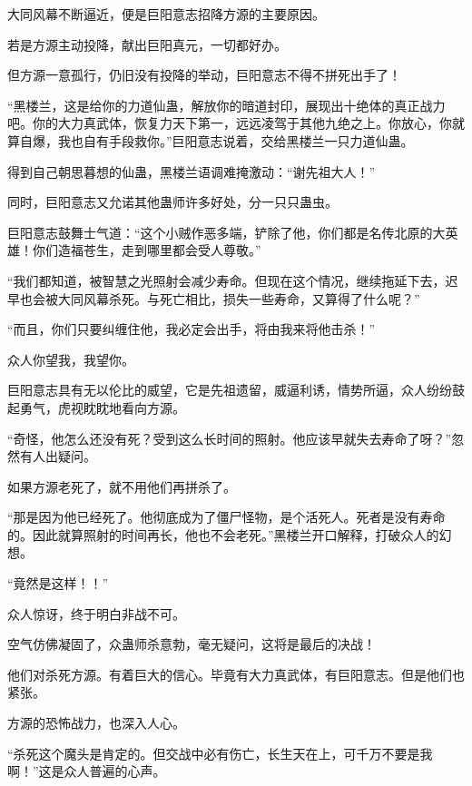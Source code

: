
\begin{this_body}



大同风幕不断逼近，便是巨阳意志招降方源的主要原因。

若是方源主动投降，献出巨阳真元，一切都好办。

但方源一意孤行，仍旧没有投降的举动，巨阳意志不得不拼死出手了！

“黑楼兰，这是给你的力道仙蛊，解放你的暗道封印，展现出十绝体的真正战力吧。你的大力真武体，恢复力天下第一，远远凌驾于其他九绝之上。你放心，你就算自爆，我也自有手段救你。”巨阳意志说着，交给黑楼兰一只力道仙蛊。

得到自己朝思暮想的仙蛊，黑楼兰语调难掩激动：“谢先祖大人！”

同时，巨阳意志又允诺其他蛊师许多好处，分一只只蛊虫。

巨阳意志鼓舞士气道：“这个小贼作恶多端，铲除了他，你们都是名传北原的大英雄！你们造福苍生，走到哪里都会受人尊敬。”

“我们都知道，被智慧之光照射会减少寿命。但现在这个情况，继续拖延下去，迟早也会被大同风幕杀死。与死亡相比，损失一些寿命，又算得了什么呢？”

“而且，你们只要纠缠住他，我必定会出手，将由我来将他击杀！”

众人你望我，我望你。

巨阳意志具有无以伦比的威望，它是先祖遗留，威逼利诱，情势所逼，众人纷纷鼓起勇气，虎视眈眈地看向方源。

“奇怪，他怎么还没有死？受到这么长时间的照射。他应该早就失去寿命了呀？”忽然有人出疑问。

如果方源老死了，就不用他们再拼杀了。

“那是因为他已经死了。他彻底成为了僵尸怪物，是个活死人。死者是没有寿命的。因此就算照射的时间再长，他也不会老死。”黑楼兰开口解释，打破众人的幻想。

“竟然是这样！！”

众人惊讶，终于明白非战不可。

空气仿佛凝固了，众蛊师杀意勃，毫无疑问，这将是最后的决战！

他们对杀死方源。有着巨大的信心。毕竟有大力真武体，有巨阳意志。但是他们也紧张。

方源的恐怖战力，也深入人心。

“杀死这个魔头是肯定的。但交战中必有伤亡，长生天在上，可千万不要是我啊！”这是众人普遍的心声。


\end{this_body}
